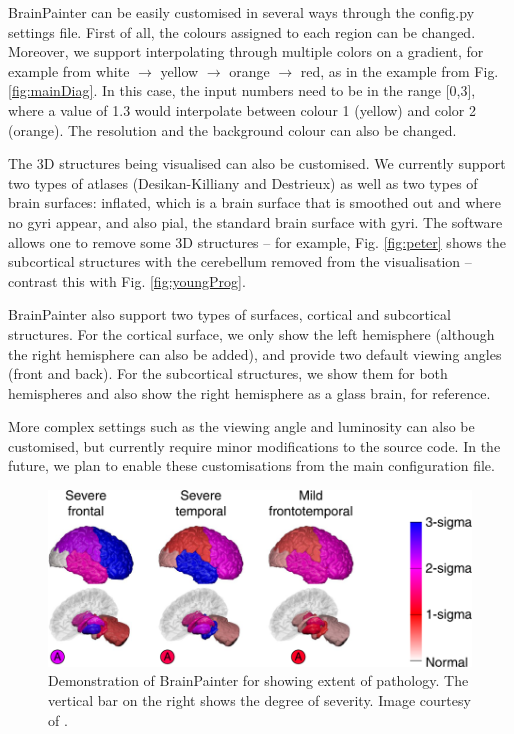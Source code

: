 \documentclass{llncs}
\begin{document}

BrainPainter can be easily customised in several ways through the config.py settings file. First of all, the colours assigned to each region can be changed. Moreover, we support interpolating through multiple colors on a gradient, for example from white $\rightarrow$ yellow $\rightarrow$ orange $\rightarrow$ red, as in the example from Fig. \ref{fig:mainDiag}. In this case, the input numbers need to be in the range [0,3], where a value of 1.3 would interpolate between colour 1 (yellow) and color 2 (orange). The resolution and the background colour can also be changed.  

The 3D structures being visualised can also be customised. We currently support two types of atlases (Desikan-Killiany and Destrieux) as well as two types of brain surfaces: inflated, which is a brain surface that is smoothed out and where no gyri appear, and also pial, the standard brain surface with gyri. The software allows one to remove some 3D structures -- for example, Fig. \ref{fig:peter} shows the subcortical structures with the cerebellum removed from the visualisation -- contrast this with Fig. \ref{fig:youngProg}. 
 

BrainPainter also support two types of surfaces, cortical and subcortical structures. For the cortical surface, we only show the left hemisphere (although the right hemisphere can also be added), and provide two default viewing angles (front and back). For the subcortical structures, we show them for both hemispheres and also show the right hemisphere as a glass brain, for reference.

More complex settings such as the viewing angle and luminosity can also be customised, but currently require minor modifications to the source code. In the future, we plan to enable these customisations from the main configuration file.
 

\begin{figure}
\centering
 \includegraphics[width=1\textwidth]{images/young_3brains.png}
 \caption{Demonstration of BrainPainter for showing extent of pathology. The vertical bar on the right shows the degree of severity. Image courtesy of \cite{young2018uncovering}.}
 \label{fig:youngExtent}
\end{figure}
\end{document}
